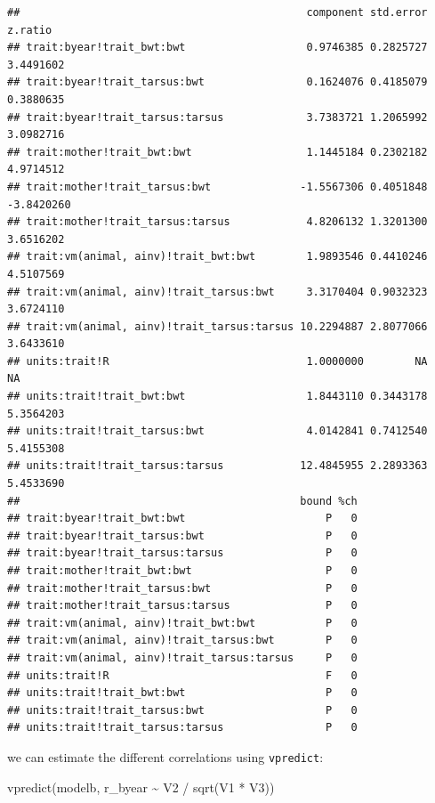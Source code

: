 \documentclass[
  12pt,
]{book}
\newenvironment{Shaded}{\begin{snugshade}}{\end{snugshade}}
\newcommand{\FunctionTok}[1]{\textcolor[rgb]{0.00,0.00,0.00}{#1}}
\newcommand{\NormalTok}[1]{#1}
\newcommand{\SpecialCharTok}[1]{\textcolor[rgb]{0.00,0.00,0.00}{#1}}
\begin{document}
\begin{verbatim}
##                                             component std.error    z.ratio
## trait:byear!trait_bwt:bwt                   0.9746385 0.2825727  3.4491602
## trait:byear!trait_tarsus:bwt                0.1624076 0.4185079  0.3880635
## trait:byear!trait_tarsus:tarsus             3.7383721 1.2065992  3.0982716
## trait:mother!trait_bwt:bwt                  1.1445184 0.2302182  4.9714512
## trait:mother!trait_tarsus:bwt              -1.5567306 0.4051848 -3.8420260
## trait:mother!trait_tarsus:tarsus            4.8206132 1.3201300  3.6516202
## trait:vm(animal, ainv)!trait_bwt:bwt        1.9893546 0.4410246  4.5107569
## trait:vm(animal, ainv)!trait_tarsus:bwt     3.3170404 0.9032323  3.6724110
## trait:vm(animal, ainv)!trait_tarsus:tarsus 10.2294887 2.8077066  3.6433610
## units:trait!R                               1.0000000        NA         NA
## units:trait!trait_bwt:bwt                   1.8443110 0.3443178  5.3564203
## units:trait!trait_tarsus:bwt                4.0142841 0.7412540  5.4155308
## units:trait!trait_tarsus:tarsus            12.4845955 2.2893363  5.4533690
##                                            bound %ch
## trait:byear!trait_bwt:bwt                      P   0
## trait:byear!trait_tarsus:bwt                   P   0
## trait:byear!trait_tarsus:tarsus                P   0
## trait:mother!trait_bwt:bwt                     P   0
## trait:mother!trait_tarsus:bwt                  P   0
## trait:mother!trait_tarsus:tarsus               P   0
## trait:vm(animal, ainv)!trait_bwt:bwt           P   0
## trait:vm(animal, ainv)!trait_tarsus:bwt        P   0
## trait:vm(animal, ainv)!trait_tarsus:tarsus     P   0
## units:trait!R                                  F   0
## units:trait!trait_bwt:bwt                      P   0
## units:trait!trait_tarsus:bwt                   P   0
## units:trait!trait_tarsus:tarsus                P   0
\end{verbatim}

we can estimate the different correlations using \texttt{vpredict}:

\begin{Shaded}
\begin{Highlighting}[]
\FunctionTok{vpredict}\NormalTok{(modelb, r\_byear }\SpecialCharTok{\textasciitilde{}}\NormalTok{ V2 }\SpecialCharTok{/} \FunctionTok{sqrt}\NormalTok{(V1 }\SpecialCharTok{*}\NormalTok{ V3))}
\end{Highlighting}
\end{Shaded}
\end{document}
